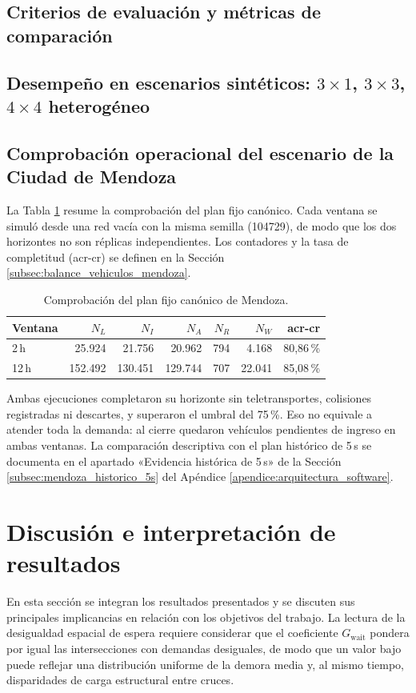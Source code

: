 \subsection{Criterios de evaluación y métricas de comparación}

\subsection{Desempeño en escenarios sintéticos: \texorpdfstring{$3\times1$, $3\times3$, $4\times4$ heterogéneo}{3x1, 3x3, 4x4 heterogéneo}}

\subsection{Comprobación operacional del escenario de la Ciudad de Mendoza}
\label{sec:resultados_mendoza_balance}

La Tabla \ref{tab:metricas_validacion_mendoza} resume la comprobación del plan fijo canónico. Cada ventana se simuló desde una red vacía con la misma semilla (104729), de modo que los dos horizontes no son réplicas independientes. Los contadores y la tasa de completitud (\acrshort{acr-cr}) se definen en la Sección \ref{subsec:balance_vehiculos_mendoza}.

\begin{table}[H]\centering\small
\caption{Comprobación del plan fijo canónico de Mendoza.}
\label{tab:metricas_validacion_mendoza}
\begin{tabular}{@{}lrrrrrr@{}}\hline
Ventana & $N_L$ & $N_I$ & $N_A$ & $N_R$ & $N_W$ & \acrshort{acr-cr} \\ \hline
2\,h & 25.924 & 21.756 & 20.962 & 794 & 4.168 & 80,86\,\% \\
12\,h & 152.492 & 130.451 & 129.744 & 707 & 22.041 & 85,08\,\% \\ \hline
\end{tabular}
\end{table}

Ambas ejecuciones completaron su horizonte sin teletransportes, colisiones registradas ni descartes, y superaron el umbral del 75\,\%. Eso no equivale a atender toda la demanda: al cierre quedaron vehículos pendientes de ingreso en ambas ventanas. La comparación descriptiva con el plan histórico de 5\,s se documenta en el apartado «Evidencia histórica de 5\,s» de la Sección \ref{subsec:mendoza_historico_5s} del Apéndice \ref{apendice:arquitectura_software}.

\section{Discusión e interpretación de resultados}

En esta sección se integran los resultados presentados y se discuten sus principales implicancias en relación con los objetivos del trabajo. La lectura de la desigualdad espacial de espera requiere considerar que el coeficiente $G_{\text{wait}}$ pondera por igual las intersecciones con demandas desiguales, de modo que un valor bajo puede reflejar una distribución uniforme de la demora media y, al mismo tiempo, disparidades de carga estructural entre cruces.
